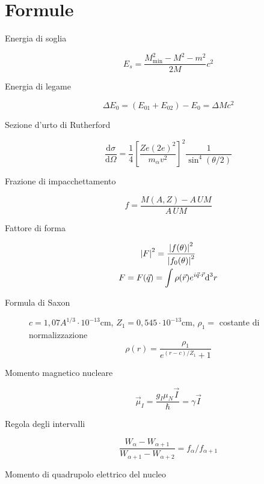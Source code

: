 \section{Formule}
\begin{description}
  \item[Energia di soglia]
	\begin{equation}
	  E_s = \frac{M_\text{min}^2 - M^2 - m^2}{2M}c^2
	\end{equation}
  \item[Energia di legame]
	\begin{equation}
	  \Delta E_0 = (E_{01} + E_{02}) - E_0 = \Delta M c^2
	\end{equation}
  \item[Sezione d'urto di Rutherford]
	\begin{equation}
	  \frac{\text{d}\sigma}{\text{d}\Omega} =
	  \frac{1}{4}\left[\frac{Ze(2e)^2}{m_\alpha v^2}\right]^2
	  \frac{1}{\sin^4(\theta/2)}
	\end{equation}
  \item[Frazione di impacchettamento]
	\begin{equation}
	  f = \frac{M(A,Z) - A\,UM}{A\,UM}
	\end{equation}
  \item[Fattore di forma] 
	\begin{gather}
	  \left| F \right|^2 = \frac{\left| f(\theta) \right|^2}{\left| f_0(\theta) \right|^2}\\
	  F = F(\vec{q}) = \int \rho(\vec{r})e^{i\vec{q}\cdot\vec{r}}\text{d}^3r
	\end{gather}
  \item[Formula di Saxon] $c = 1,07A^{1/3}\cdot 10^{-13}$cm, $Z_1 = 0,545\cdot
	10^{-13}$cm, $\rho_1 =$ costante di normalizzazione
	\begin{equation}
	  \rho(r) = \frac{\rho_1}{e^{(r-c)/Z_1}+1}
	\end{equation}
  \item[Momento magnetico nucleare]
	\begin{equation}
	  \vec{\mu}_I = \frac{g_I\mu_N\vec{I}}{\hslash} = \gamma \vec{I}
	\end{equation}
  \item[Regola degli intervalli] 
	\begin{equation}
	  \frac{W_\alpha-W_{\alpha+1}}{W_{\alpha+1}-W_{\alpha+2}} =
	  f_\alpha/f_{\alpha+1}
	\end{equation}
  \item[Momento di quadrupolo elettrico del nucleo]
	\begin{equation}

\end{equation}
\end{description}
